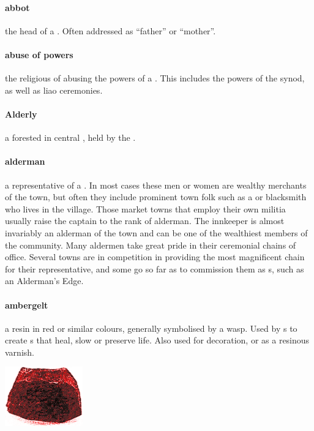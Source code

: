 \paragraph{abbot} the head  of a . Often addressed as “father” or “mother”. 
\paragraph{abuse of powers} the religious  of abusing the powers of a . This includes the powers of the synod, as well as liao ceremonies.
\paragraph{Alderly} a forested  in central , held by the .
\paragraph{alderman} a representative of a . In most cases these men or women are wealthy merchants of the town, but often they include prominent town folk such as a  or blacksmith who lives in the village. Those market towns that employ their own militia usually raise the captain to the rank of alderman. The innkeeper is almost invariably an alderman of the town and can be one of the wealthiest members of the community. Many aldermen take great pride in their ceremonial chains of office. Several towns are in competition in providing the most magnificent chain for their representative, and some go so far as to commission them as s, such as an Alderman's Edge. 
\paragraph{ambergelt} a resin in red or similar colours, generally symbolised by a wasp. Used by s to create s that heal, slow or preserve life. Also used for decoration, or as a resinous varnish.\begin{center}\includegraphics[width=3.36cm]{encyclopedia/ambergelt} \end{center}

